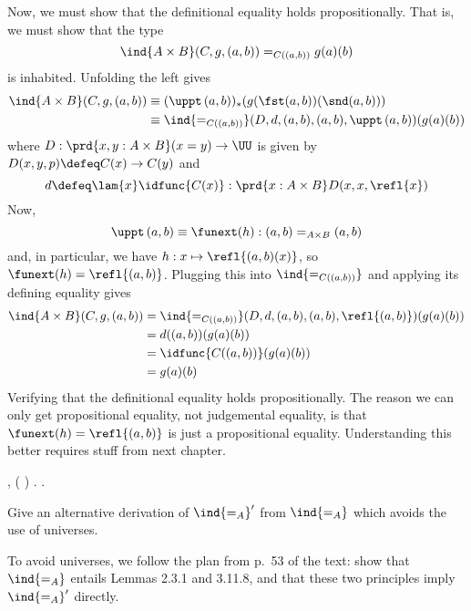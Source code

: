 Now, we must show that the definitional equality holds propositionally.  That
is, we must show that the type
\[
  \ind{A \times B}(C, g, (a, b)) =_{C((a, b))} g(a)(b)
\]
is inhabited.  Unfolding the left gives
\begin{align*}
\ind{A \times B}(C, g, (a, b))
&\equiv
(\uppt\, (a, b))_{*}(g(\fst (a, b))(\snd (a, b)))
\\&\equiv
\ind{=_{C((a, b))}}(D, d, (a, b), (a, b), \uppt\, (a, b))(g(a)(b))
\end{align*}
where $D : \prd{x, y : A \times B} (x = y) \to \UU$ is given by $D(x, y, p)
\defeq C(x) \to C(y)$ and
\[
d \defeq \lam{x}\idfunc{C(x)} : \prd{x:A\times B} D(x, x, \refl{x})
\]
Now,
\[
\uppt\, (a, b) \equiv \funext(h) : (a, b) =_{A \times B} (a, b)
\]
and, in particular, we have $h : x \mapsto \refl{(a, b)(x)}$, so $\funext(h) =
\refl{(a, b)}$.  Plugging this into $\ind{=_{C((a, b))}}$ and applying its
defining equality gives
\begin{align*}
\ind{A \times B}(C, g, (a, b))
&=
\ind{=_{C((a, b))}}(D, d, (a, b), (a, b), \refl{(a, b)})(g(a)(b))
\\&=
d((a, b))(g(a)(b))
\\&=
\idfunc{C((a, b))}(g(a)(b))
\\&=
g(a)(b)
\end{align*}
Verifying that the definitional equality holds propositionally.  The reason we
can only get propositional equality, not judgemental equality, is that
$\funext(h) = \refl{(a, b)}$ is just a propositional equality.  Understanding
this better requires stuff from next chapter. 
 \begin{coqdoccode}
\coqdocemptyline
\coqdocnoindent
{} \coqdockw{\ensuremath{\forall}}    ,    (  ) \coqdocnotation{=}   . .\coqdoceol
\coqdocemptyline
\coqdocemptyline
\end{coqdoccode}
Give an alternative derivation of $\ind{=_{A}}'$ from $\ind{=_{A}}$ which
avoids the use of universes. 

 \soln
To avoid universes, we follow the plan from p.~53 of the text: show that
$\ind{=_{A}}$ entails Lemmas 2.3.1 and 3.11.8, and that these two principles
imply $\ind{=_{A}}'$ directly.  


